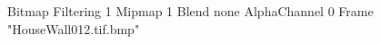 {Bitmap
	{Filtering 1}
	{Mipmap 1}
	{Blend none}
	{AlphaChannel 0}
	{Frame "HouseWall012.tif.bmp"}
}
